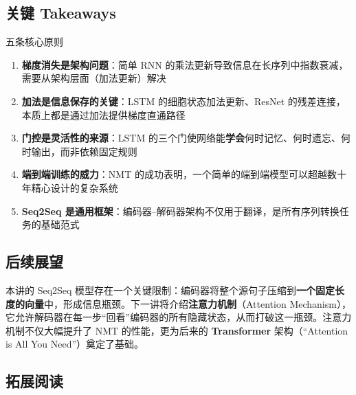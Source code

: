 \documentclass[a4paper]{article}
\begin{document}
\subsection{关键 Takeaways}

\begin{importantbox}{五条核心原则}
\begin{enumerate}
    \item \textbf{梯度消失是架构问题}：简单 RNN 的乘法更新导致信息在长序列中指数衰减，需要从架构层面（加法更新）解决
    \item \textbf{加法是信息保存的关键}：LSTM 的细胞状态加法更新、ResNet 的残差连接，本质上都是通过加法提供梯度直通路径
    \item \textbf{门控是灵活性的来源}：LSTM 的三个门使网络能\textbf{学会}何时记忆、何时遗忘、何时输出，而非依赖固定规则
    \item \textbf{端到端训练的威力}：NMT 的成功表明，一个简单的端到端模型可以超越数十年精心设计的复杂系统
    \item \textbf{Seq2Seq 是通用框架}：编码器--解码器架构不仅用于翻译，是所有序列转换任务的基础范式
\end{enumerate}
\end{importantbox}

\subsection{后续展望}

本讲的 Seq2Seq 模型存在一个关键限制：编码器将整个源句子压缩到\textbf{一个固定长度的向量}中，形成信息瓶颈。下一讲将介绍\textbf{注意力机制}（Attention Mechanism），它允许解码器在每一步``回看''编码器的所有隐藏状态，从而打破这一瓶颈。注意力机制不仅大幅提升了 NMT 的性能，更为后来的 \textbf{Transformer} 架构（``Attention is All You Need''）奠定了基础。

\subsection{拓展阅读}
\end{document}
